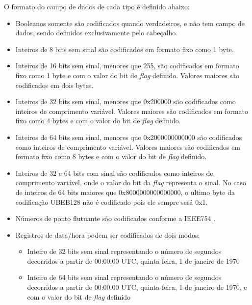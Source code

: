 O formato do campo de dados de cada tipo é definido abaixo:

\begin{itemize}

    \item Booleanos somente são codificados quando verdadeiros, e não tem campo de dados, sendo definidos exclusivamente pelo cabeçalho.

    \item Inteiros de 8 bits sem sinal são codificados em formato fixo como 1 byte.

    \item Inteiros de 16 bits sem sinal, menores que 255, são codificados em formato fixo como 1 byte e com o valor do bit de \textit{flag} definido. Valores maiores são codificados em dois bytes.

    \item Inteiros de 32 bits sem sinal, menores que 0x200000 são codificados como inteiros de comprimento variável. Valores maiores são codificados em formato fixo como 4 bytes e com o valor do bit de \textit{flag} definido.

    \item Inteiros de 64 bits sem sinal, menores que 0x2000000000000 são codificados como inteiros de comprimento variável. Valores maiores são codificados em formato fixo como 8 bytes e com o valor do bit de \textit{flag} definido.

    \item Inteiros de 32 e 64 bits com sinal são codificados como inteiros de comprimento variável, onde o valor do bit da \textit{flag} representa o sinal. No caso de inteiros de 64 bits maiores que 0x8000000000000000, o ultimo byte da codificação UBEB128 não é codificado pois ele sempre será 0x1.

    \item Números de ponto flutuante são codificados conforme a IEEE754 \cite{noauthor_ieee_2019}.

    \item Registros de data/hora podem ser codificados de dois modos:
\begin{itemize}
	\item Inteiro de 32 bits sem sinal representando o número de segundos decorridos a partir de 00:00:00 UTC, quinta-feira, 1 de janeiro de 1970
    \item Inteiro de 64 bits sem sinal representando o número de segundos decorridos a partir de 00:00:00 UTC, quinta-feira, 1 de janeiro de 1970, e com o valor do bit de \textit{flag} definido
\end{itemize}


\end{itemize}
